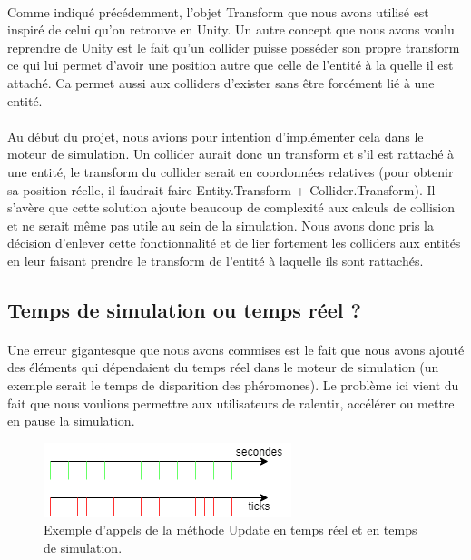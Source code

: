 \documentclass{EPUProjetDi}
\begin{document}
\paragraph{}
Comme indiqué précédemment, l'objet Transform que nous avons utilisé est inspiré de celui qu'on retrouve en Unity. Un autre concept que nous avons voulu reprendre de Unity est le fait qu'un
collider puisse posséder son propre transform ce qui lui permet d'avoir une position autre que celle de l'entité à la quelle il est attaché. Ca permet aussi aux colliders d'exister sans être forcément
lié à une entité.

\paragraph{}
Au début du projet, nous avions pour intention d'implémenter cela dans le moteur de simulation. 
Un collider aurait donc un transform et s'il est rattaché à une entité, le transform du collider serait en coordonnées relatives (pour obtenir sa position réelle, il faudrait faire Entity.Transform + Collider.Transform).
Il s'avère que cette solution ajoute beaucoup de complexité aux calculs de collision et ne serait même pas utile au sein de la simulation. Nous avons donc pris la décision d'enlever cette 
fonctionnalité et de lier fortement les colliders aux entités en leur faisant prendre le transform de l'entité à laquelle ils sont rattachés.

\subsection{Temps de simulation ou temps réel ?}
\paragraph{}
Une erreur gigantesque que nous avons commises est le fait que nous avons ajouté des éléments qui dépendaient du temps réel dans le moteur de simulation (un exemple serait le temps de disparition des phéromones).
Le problème ici vient du fait que nous voulions permettre aux utilisateurs de ralentir, accélérer ou mettre en pause la simulation.

\begin{figure}[h]
    \centering
    \includegraphics[scale=1]{ticks_secondes.png}
    \caption{Exemple d'appels de la méthode Update en temps réel et en temps de simulation.}
    \label{fig:ticks_secondes}
\end{figure}
\end{document}
